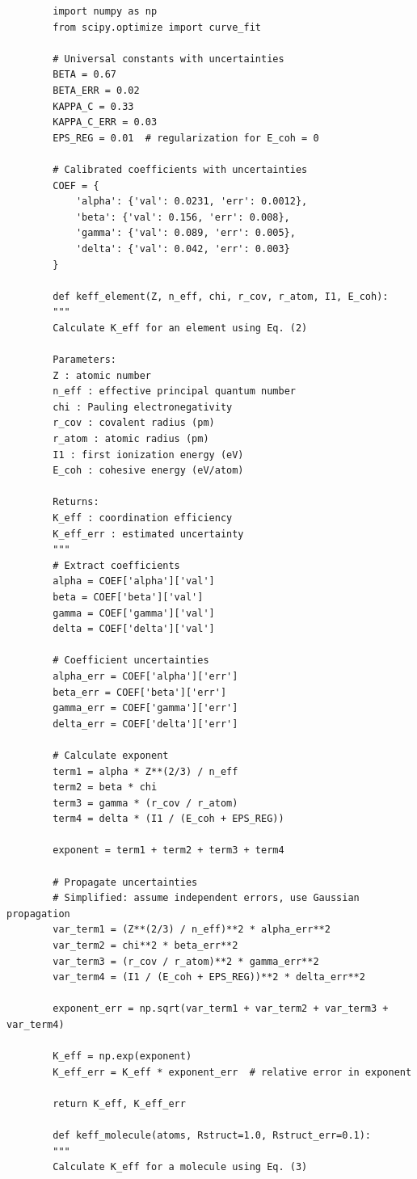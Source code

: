 \documentclass[12pt,a4paper]{article}
\theoremstyle{remark}
\begin{document}
	\begin{verbatim}
		import numpy as np
		from scipy.optimize import curve_fit
		
		# Universal constants with uncertainties
		BETA = 0.67
		BETA_ERR = 0.02
		KAPPA_C = 0.33
		KAPPA_C_ERR = 0.03
		EPS_REG = 0.01  # regularization for E_coh = 0
		
		# Calibrated coefficients with uncertainties
		COEF = {
			'alpha': {'val': 0.0231, 'err': 0.0012},
			'beta': {'val': 0.156, 'err': 0.008},
			'gamma': {'val': 0.089, 'err': 0.005},
			'delta': {'val': 0.042, 'err': 0.003}
		}
		
		def keff_element(Z, n_eff, chi, r_cov, r_atom, I1, E_coh):
		"""
		Calculate K_eff for an element using Eq. (2)
		
		Parameters:
		Z : atomic number
		n_eff : effective principal quantum number
		chi : Pauling electronegativity
		r_cov : covalent radius (pm)
		r_atom : atomic radius (pm)
		I1 : first ionization energy (eV)
		E_coh : cohesive energy (eV/atom)
		
		Returns:
		K_eff : coordination efficiency
		K_eff_err : estimated uncertainty
		"""
		# Extract coefficients
		alpha = COEF['alpha']['val']
		beta = COEF['beta']['val']
		gamma = COEF['gamma']['val']
		delta = COEF['delta']['val']
		
		# Coefficient uncertainties
		alpha_err = COEF['alpha']['err']
		beta_err = COEF['beta']['err']
		gamma_err = COEF['gamma']['err']
		delta_err = COEF['delta']['err']
		
		# Calculate exponent
		term1 = alpha * Z**(2/3) / n_eff
		term2 = beta * chi
		term3 = gamma * (r_cov / r_atom)
		term4 = delta * (I1 / (E_coh + EPS_REG))
		
		exponent = term1 + term2 + term3 + term4
		
		# Propagate uncertainties
		# Simplified: assume independent errors, use Gaussian propagation
		var_term1 = (Z**(2/3) / n_eff)**2 * alpha_err**2
		var_term2 = chi**2 * beta_err**2
		var_term3 = (r_cov / r_atom)**2 * gamma_err**2
		var_term4 = (I1 / (E_coh + EPS_REG))**2 * delta_err**2
		
		exponent_err = np.sqrt(var_term1 + var_term2 + var_term3 + var_term4)
		
		K_eff = np.exp(exponent)
		K_eff_err = K_eff * exponent_err  # relative error in exponent
		
		return K_eff, K_eff_err
		
		def keff_molecule(atoms, Rstruct=1.0, Rstruct_err=0.1):
		"""
		Calculate K_eff for a molecule using Eq. (3)
		

\end{verbatim}
\end{document}
